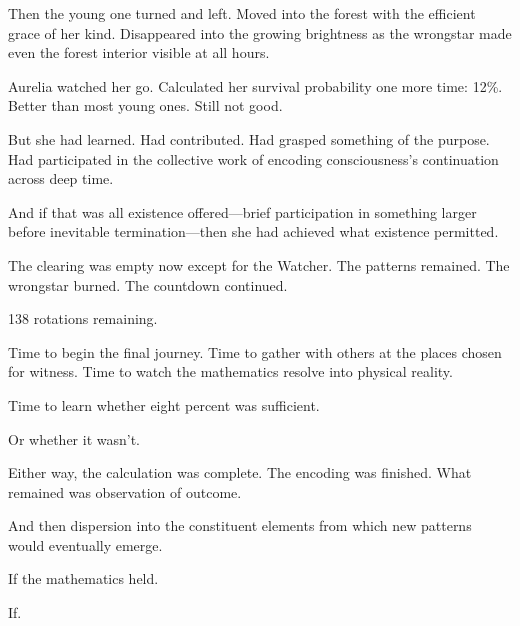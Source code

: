 Then the young one turned and left. Moved into the forest with the efficient grace of her kind. Disappeared into the growing brightness as the wrongstar made even the forest interior visible at all hours.

Aurelia watched her go. Calculated her survival probability one more time: 12\%. Better than most young ones. Still not good.

But she had learned. Had contributed. Had grasped something of the purpose. Had participated in the collective work of encoding consciousness's continuation across deep time.

And if that was all existence offered—brief participation in something larger before inevitable termination—then she had achieved what existence permitted.

The clearing was empty now except for the Watcher. The patterns remained. The wrongstar burned. The countdown continued.

138 rotations remaining.

Time to begin the final journey. Time to gather with others at the places chosen for witness. Time to watch the mathematics resolve into physical reality.

Time to learn whether eight percent was sufficient.

Or whether it wasn't.

Either way, the calculation was complete. The encoding was finished. What remained was observation of outcome.

And then dispersion into the constituent elements from which new patterns would eventually emerge.

If the mathematics held.

If.

